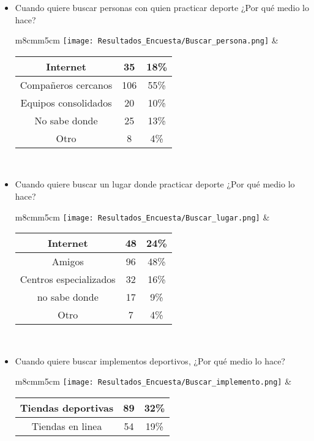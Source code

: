 \begin{itemize}
\begin{tabular}{m{8cm}m{5cm}}
      \end{tabular}
  \item Cuando quiere buscar personas con quien practicar deporte ¿Por qué medio lo hace? \\
      \begin{tabular}{m{8cm}m{5cm}}
        \texttt{[image: Resultados\_Encuesta/Buscar\_persona.png]} &
        \begin{tabular}{|c|cc|}
        \hline
         Internet & 35 & 18\% \\ \hline
         Compañeros cercanos & 106 & 55\% \\ \hline
         Equipos consolidados & 20 & 10\% \\ \hline
         No sabe donde & 25 & 13\% \\ \hline
         Otro & 8 & 4\% \\ \hline
        \end{tabular} \\
      \end{tabular}
  \item Cuando quiere buscar un lugar donde practicar deporte ¿Por qué medio lo hace? \\
      \begin{tabular}{m{8cm}m{5cm}}
        \texttt{[image: Resultados\_Encuesta/Buscar\_lugar.png]} &
        \begin{tabular}{|c|cc|}
        \hline
         Internet & 48 & 24\% \\ \hline
         Amigos & 96 & 48\% \\ \hline
         Centros especializados & 32 & 16\% \\ \hline
         no sabe donde & 17 & 9\% \\ \hline
         Otro & 7 & 4\% \\ \hline
        \end{tabular} \\
      \end{tabular}
  \item Cuando quiere buscar implementos deportivos, ¿Por qué medio lo hace? \\
      \begin{tabular}{m{8cm}m{5cm}}
        \texttt{[image: Resultados\_Encuesta/Buscar\_implemento.png]} &
        \begin{tabular}{|c|cc|}
        \hline
         Tiendas deportivas & 89 & 32\% \\ \hline
         Tiendas en linea & 54 & 19\% \\ \hline

\end{tabular}
\end{tabular}
\end{itemize}
